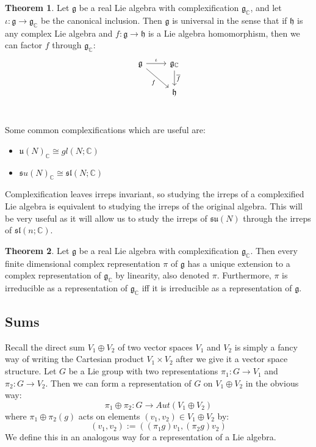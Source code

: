 \documentclass[11pt, oneside]{article}   	%
\theoremstyle{definition}
\newtheorem{theorem}{Theorem}[section]
\begin{document}
\begin{theorem}
	Let $\mathfrak g$ be a real Lie algebra with complexification $\mathfrak g_\mathbb{C}$, and let $\iota : \mathfrak g\rightarrow
	\mathfrak g_\mathbb{C}$ be the canonical inclusion. Then $\mathfrak g$ is universal in the sense that if $\mathfrak h$ is any 
	complex Lie algebra and $f : \mathfrak g\rightarrow\mathfrak h$ is a Lie algebra homomorphism, then we can factor $f$ through 
	$\mathfrak g_\mathbb{C}$:
	\[\begin{tikzcd}
		\mathfrak g\arrow[r, "\iota"]\arrow[dr, swap, "f"] & \mathfrak g_\mathbb{C}\arrow[d, "\overline{f}"] \\
		& \mathfrak h \\
	\end{tikzcd}\]
\end{theorem}
Some common complexifications which are useful are:
\begin{itemize}
	\item $\mathfrak u(N)_\mathbb{C}\cong gl(N; \mathbb C)$
	\item $\mathfrak su(N)_\mathbb{C}\cong \mathfrak{sl}(N; \mathbb C)$
\end{itemize}

Complexification leaves irreps invariant, so studying the irreps of a complexified Lie algebra is equivalent to studying the irreps of the 
original algebra. This will be very useful as it will allow us to study the irreps of $\mathfrak{su}(N)$ through the irreps of $\mathfrak{sl}(n; 
\mathbb C)$. 

\begin{theorem}
	Let $\mathfrak g$ be a real Lie algebra with complexification $\mathfrak g_\mathbb{C}$. Then every finite dimensional complex 
	representation $\pi$ of $\mathfrak g$ has a unique extension to a complex representation of $\mathfrak g_{\mathbb C}$ by linearity, 
	also denoted $\pi$. Furthermore, $\pi$ is irreducible as a representation of $\mathfrak g_{\mathbb C}$ iff it is irreducible as a 
	representation of $\mathfrak g$. 
\end{theorem}

\subsection{Sums}

Recall the direct sum $V_1\oplus V_2$ of two vector spaces $V_1$ and $V_2$ is simply a fancy way of writing 
the Cartesian product $V_1\times V_2$ after we give it a vector space structure. 
Let $G$ be a Lie group with two representations $\pi_1 : G\rightarrow V_1$ and $\pi_2 : G\rightarrow V_2$. 
Then we can form a representation of $G$ on $V_1\oplus V_2$ in the obvious way:
\begin{equation}
	\pi_1\oplus\pi_2 : G\rightarrow Aut(V_1\oplus V_2)
\end{equation}
where $\pi_1\oplus\pi_2(g)$ acts on elements $(v_1, v_2)\in V_1\oplus V_2$ by:
\begin{equation}
	[(\pi_1\oplus \pi_2)g] (v_1, v_2) := ((\pi_1g)v_1, (\pi_2g)v_2)
\end{equation}
We define this in an analogous way for a representation of a Lie algebra. 
\end{document}
